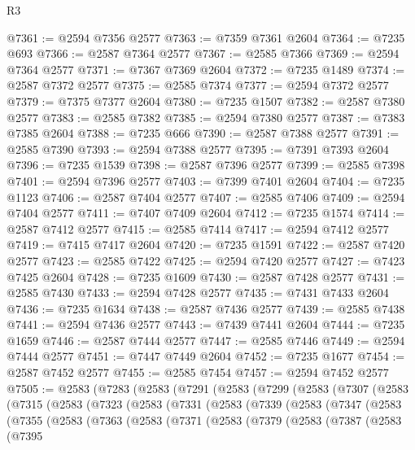 \begin{lexlean}{R3}
\begin{coremodule}
@7361 := @2594 @7356 @2577
@7363 := @7359 @7361 @2604
@7364 := @7235 @693
@7366 := @2587 @7364 @2577
@7367 := @2585 @7366
@7369 := @2594 @7364 @2577
@7371 := @7367 @7369 @2604
@7372 := @7235 @1489
@7374 := @2587 @7372 @2577
@7375 := @2585 @7374
@7377 := @2594 @7372 @2577
@7379 := @7375 @7377 @2604
@7380 := @7235 @1507
@7382 := @2587 @7380 @2577
@7383 := @2585 @7382
@7385 := @2594 @7380 @2577
@7387 := @7383 @7385 @2604
@7388 := @7235 @666
@7390 := @2587 @7388 @2577
@7391 := @2585 @7390
@7393 := @2594 @7388 @2577
@7395 := @7391 @7393 @2604
@7396 := @7235 @1539
@7398 := @2587 @7396 @2577
@7399 := @2585 @7398
@7401 := @2594 @7396 @2577
@7403 := @7399 @7401 @2604
@7404 := @7235 @1123
@7406 := @2587 @7404 @2577
@7407 := @2585 @7406
@7409 := @2594 @7404 @2577
@7411 := @7407 @7409 @2604
@7412 := @7235 @1574
@7414 := @2587 @7412 @2577
@7415 := @2585 @7414
@7417 := @2594 @7412 @2577
@7419 := @7415 @7417 @2604
@7420 := @7235 @1591
@7422 := @2587 @7420 @2577
@7423 := @2585 @7422
@7425 := @2594 @7420 @2577
@7427 := @7423 @7425 @2604
@7428 := @7235 @1609
@7430 := @2587 @7428 @2577
@7431 := @2585 @7430
@7433 := @2594 @7428 @2577
@7435 := @7431 @7433 @2604
@7436 := @7235 @1634
@7438 := @2587 @7436 @2577
@7439 := @2585 @7438
@7441 := @2594 @7436 @2577
@7443 := @7439 @7441 @2604
@7444 := @7235 @1659
@7446 := @2587 @7444 @2577
@7447 := @2585 @7446
@7449 := @2594 @7444 @2577
@7451 := @7447 @7449 @2604
@7452 := @7235 @1677
@7454 := @2587 @7452 @2577
@7455 := @2585 @7454
@7457 := @2594 @7452 @2577
@7505 := @2583
    (@7283
      (@2583
        (@7291
          (@2583
            (@7299
              (@2583
                (@7307
                  (@2583
                    (@7315
                      (@2583
                        (@7323
                          (@2583
                            (@7331
                              (@2583
                                (@7339
                                  (@2583
                                    (@7347
                                      (@2583
                                        (@7355
                                          (@2583
                                            (@7363
                                              (@2583
                                                (@7371
                                                  (@2583
                                                    (@7379
                                                      (@2583
                                                        (@7387
                                                          (@2583
                                                            (@7395

\end{coremodule}
\end{lexlean}
